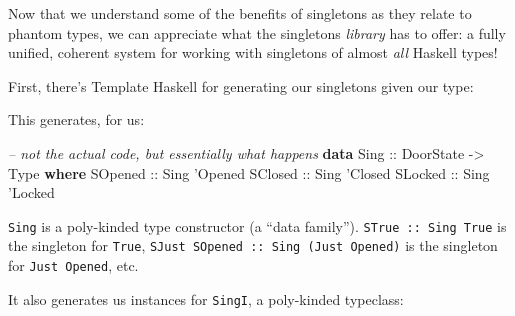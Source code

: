 \documentclass[]{article}
\newenvironment{Shaded}{}{}
\newcommand{\KeywordTok}[1]{\textcolor[rgb]{0.00,0.44,0.13}{\textbf{#1}}}
\newcommand{\DataTypeTok}[1]{\textcolor[rgb]{0.56,0.13,0.00}{#1}}
\newcommand{\CharTok}[1]{\textcolor[rgb]{0.25,0.44,0.63}{#1}}
\newcommand{\CommentTok}[1]{\textcolor[rgb]{0.38,0.63,0.69}{\textit{#1}}}
\newcommand{\OtherTok}[1]{\textcolor[rgb]{0.00,0.44,0.13}{#1}}
\newcommand{\FunctionTok}[1]{\textcolor[rgb]{0.02,0.16,0.49}{#1}}
\newcommand{\NormalTok}[1]{#1}
\begin{document}
Now that we understand some of the benefits of singletons as they relate to
phantom types, we can appreciate what the singletons \emph{library} has to
offer: a fully unified, coherent system for working with singletons of almost
\emph{all} Haskell types!

First, there's Template Haskell for generating our singletons given our type:

\begin{Shaded}
\end{Shaded}

This generates, for us:

\begin{Shaded}
\begin{Highlighting}[]
\CommentTok{-- not the actual code, but essentially what happens}
\KeywordTok{data} \DataTypeTok{Sing}\OtherTok{ ::} \DataTypeTok{DoorState} \OtherTok{->} \DataTypeTok{Type} \KeywordTok{where}
    \DataTypeTok{SOpened}\OtherTok{ ::} \DataTypeTok{Sing} \CharTok{'Opened}
    \DataTypeTok{SClosed}\OtherTok{ ::} \DataTypeTok{Sing} \CharTok{'Closed}
    \DataTypeTok{SLocked}\OtherTok{ ::} \DataTypeTok{Sing} \CharTok{'Locked}
\end{Highlighting}
\end{Shaded}

\texttt{Sing} is a poly-kinded type constructor (a ``data family'').
\texttt{STrue\ ::\ Sing\ \textquotesingle{}True} is the singleton for
\texttt{\textquotesingle{}True},
\texttt{SJust\ SOpened\ ::\ Sing\ (\textquotesingle{}Just\ \textquotesingle{}Opened)}
is the singleton for \texttt{\textquotesingle{}Just\ \textquotesingle{}Opened},
etc.

It also generates us instances for \texttt{SingI}, a poly-kinded typeclass:
\end{document}
